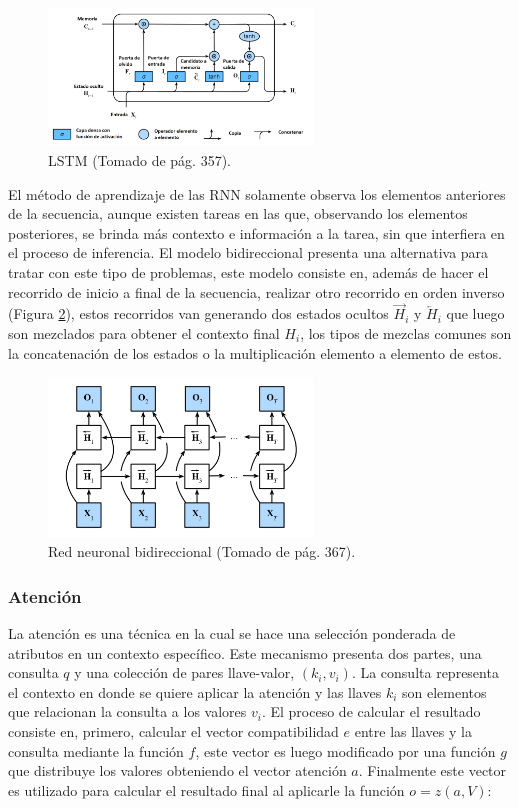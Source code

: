 \documentclass[a4paper,11pt,twocolumn,twoside]{article}
\begin{document}
\begin{figure}[h]
    \centering
	\includegraphics[width=7cm,clip]{Graphics/rnn_lstm.png}
	\caption{LSTM (Tomado de \cite{d2l} pág. 357).}
	\label{fig:rnn_lstm}
\end{figure}

El método de aprendizaje de las RNN solamente observa los elementos anteriores de la secuencia, aunque existen
tareas en las que, observando los elementos posteriores, se brinda más contexto e información a la tarea, sin que interfiera
en el proceso de inferencia. El modelo bidireccional presenta una alternativa para tratar con este tipo de problemas, 
este modelo consiste en, además de hacer el recorrido de inicio a final de la secuencia, realizar otro recorrido en orden 
inverso (Figura \ref{fig:rnn_bidirectional}), estos recorridos van generando dos estados ocultos $\overrightarrow{H}_{i}$ y $\overleftarrow{H}_{i}$
que luego son mezclados para obtener el contexto final $H_i$, los tipos de mezclas comunes son la concatenación de los 
estados o la multiplicación elemento a elemento de estos.

\begin{figure}[h]
    \centering
	\includegraphics[width=7cm,clip]{Graphics/rnn_bidirectional.png}
	\caption{Red neuronal bidireccional (Tomado de \cite{d2l} pág. 367).}
	\label{fig:rnn_bidirectional}
\end{figure}


\subsubsection{Atención}

La atención es una técnica en la cual se hace una selección ponderada de atributos en un contexto específico. 
Este mecanismo presenta dos partes, una consulta $q$ y una colección de pares llave-valor, $(k_i, v_i)$. La 
consulta representa el contexto en donde se quiere aplicar la atención y las llaves $k_i$ son elementos que 
relacionan la consulta a los valores $v_i$. El proceso de calcular el resultado consiste en, primero, calcular 
el vector compatibilidad $e$ entre las llaves y la consulta mediante la función $f$, este vector es luego 
modificado por una función $g$ que distribuye los valores obteniendo el vector atención $a$. Finalmente 
este vector es utilizado para calcular el resultado final al aplicarle la función $o = z(a, V)$:
\end{document}

